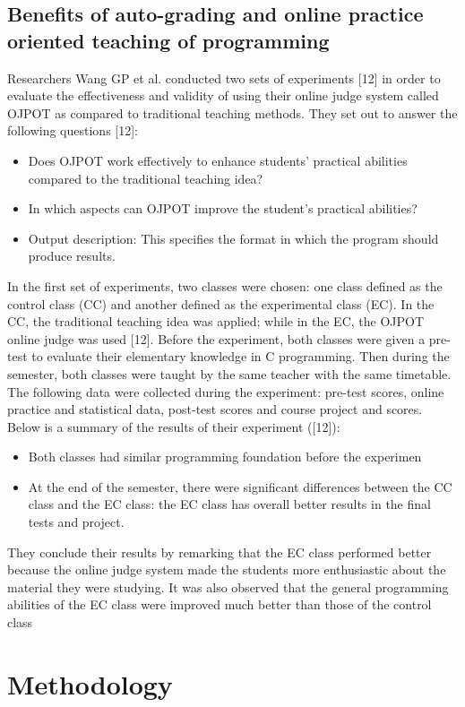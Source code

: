 \documentclass[11pt]{article}
\begin{document}
	\subsection{Benefits of auto-grading and online practice oriented teaching of programming}
		Researchers Wang GP et al. conducted two sets of experiments [12] in order to evaluate the
	effectiveness and validity of using their online judge system called OJPOT as compared to
	traditional teaching methods. They set out to answer the following questions [12]:
		\begin{itemize}
			\item  Does OJPOT work effectively to enhance students’ practical abilities compared to the
					traditional teaching idea?
			\item  In which aspects can OJPOT improve the student’s practical abilities?
			\item Output description: This specifies the format in which the program should produce
				results.
		\end{itemize}
		In the first set of experiments, two classes were chosen: one class defined as the control class (CC)
	and another defined as the experimental class (EC). In the CC, the traditional teaching idea was
	applied; while in the EC, the OJPOT online judge was used [12]. Before the experiment, both
	classes were given a pre-test to evaluate their elementary knowledge in C programming. Then
	during the semester, both classes were taught by the same teacher with the same timetable.
	The following data were collected during the experiment: pre-test scores, online practice and
	statistical data, post-test scores and course project and scores. Below is a summary of the results
	of their experiment ([12]):
		\begin{itemize}
			\item Both classes had similar programming foundation before the experimen
			\item At the end of the semester, there were significant differences between the CC class and
				the EC class: the EC class has overall better results in the final tests and project.
		\end{itemize}
		They conclude their results by remarking that the EC class performed better because the online
	judge system made the students more enthusiastic about the material they were studying. It was
	also observed that the general programming abilities of the EC class were improved much better
	than those of the control class


\section{Methodology}
\end{document}
